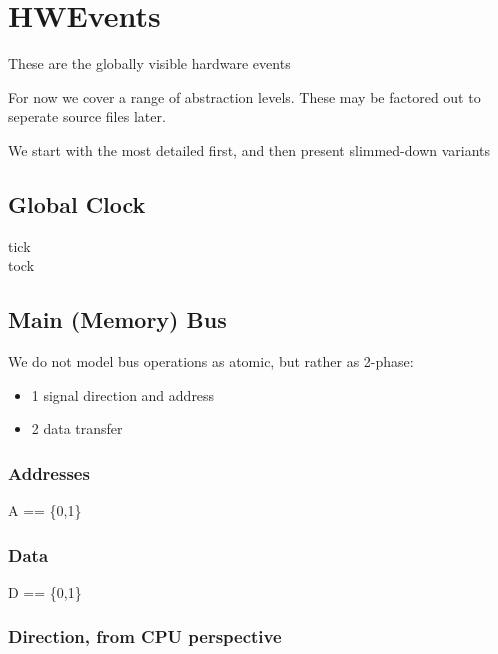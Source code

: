 
\section{HWEvents}
 These are the globally visible hardware events

 For now we cover a range of abstraction levels.
 These may be factored out to seperate source files later.

 We start with the most detailed first,
 and then present slimmed-down variants



\subsection{Global Clock}

\begin{circus}
\circchannel tick\\  %
\circchannel tock  %
\end{circus}

\subsection{Main (Memory) Bus}

  We do not model bus operations as atomic, but rather as 2-phase:
	\begin{itemize}
   \item{1} signal direction and address
   \item{2} data transfer
	 \end{itemize}

\subsubsection{Addresses}

\begin{circus}
A == \{0,1\}
\end{circus}

\subsubsection{Data}

\begin{circus}
D == \{0,1\}
\end{circus}

\subsubsection{Direction, from CPU perspective}

